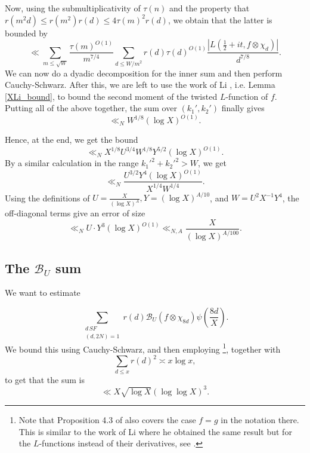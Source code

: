 \documentclass[12pt]{amsart}
\def\cB{\mathcal B}
\def\cB{\mathcal B}
\def\log{\operatorname{log}}
\begin{document}
Now, using the submultiplicativity of $\tau(n)$ and the property that $r(m^2d)\leq r(m^2)r(d) \leq 4 \tau(m)^2 r(d)$, we obtain that the latter is bounded by
$$ \ll \sum_{m \leq \sqrt{W}} \frac{\tau(m)^{O(1)}}{m^{7/4}} \sum_{d\leq W/m^2} r(d) \tau(d)^{O(1)} \frac{|L(\frac{1}{2} + it, f \otimes \chi_d)|}{d^{7/8}}. $$
We can now do a dyadic decomposition for the inner sum and then perform Cauchy-Schwarz. After this, we are left to use the work of Li \cite{XLi}, i.e. Lemma \ref{XLi_bound}, to bound the second moment of the twisted $L$-function of $f$.
Putting all of the above together, the sum over $(k_1',k_2')$ finally gives
$$ \ll_{N} W^{1/8} (\log X)^{O(1)}.$$

Hence, at the end, we get the bound
$$ \ll_{N} X^{1/8} U^{3/4} W^{1/8} Y^{5/2} (\log X)^{O(1)}. $$
By a similar calculation in the range $k_1'^2+k_2'^2 > W$, we get
$$\ll_{N} \frac{U^{3/2} Y^4 (\log X)^{O(1)}}{X^{1/4}W^{1/4}} .$$
Using the definitions of $U=\frac{X}{(\log X)^A}, Y=(\log X)^{A/10}$, and $W=U^2X^{-1}Y^4$, the off-diagonal terms give an error of size $$\ll_{N } U \cdot  Y^3 (\log X)^{O(1)} \ll_{N,A} \frac{X}{(\log X)^{A/100}}. $$

\subsection{The $\cB_U$ sum}
We want to estimate

\[\sum_{\substack{d\, SF\\(d,2N)=1}}r(d)\cB_U(f\otimes\chi_{8d})\psi\left(\frac{8d}{X}\right). \]
We bound this using Cauchy-Schwarz, and then employing \cite[Proposition 4.3]{zhou}\footnote{Note that Proposition 4.3 of \cite{zhou} also covers the case $f=g$ in the notation there. This is similar to the work of Li \cite{XLi} where he obtained the same result but for the $L$-functions instead of their derivatives, see \cite[Proposition 6.1]{XLi}.}, together with
\[\sum_{d\leq x}r(d)^2\asymp x \log x,\]
to get that the sum is
\[\ll X\sqrt{\log X}(\log\log X)^3.\]




\nocite{*}




\end{document}
